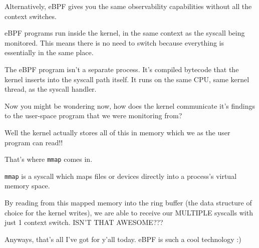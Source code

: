 Alternatively, eBPF gives you the same observability capabilities without all the context switches.

eBPF programs run inside the kernel, in the same context as the syscall being monitored. This means there is no need to switch because everything is essentially in the same place.


The eBPF program isn't a separate process. It's compiled bytecode that the kernel inserts into the syscall path itself. It runs on the same CPU, same kernel thread, as the syscall handler.

Now you might be wondering now, how does the kernel communicate it's findings to the user-space program that we were monitoring from?

Well the kernel actually stores all of this in memory which we as the user program can read!!

That's where \texttt{mmap} comes in.

\texttt{mmap} is a syscall which maps files or devices directly into a process's virtual memory space.

By reading from this mapped memory into the ring buffer (the data structure of choice for the kernel writes), we are able to receive our MULTIPLE syscalls with just 1 context switch. ISN'T THAT AWESOME???

Anyways, that's all I've got for y'all today. eBPF is such a cool technology :)


